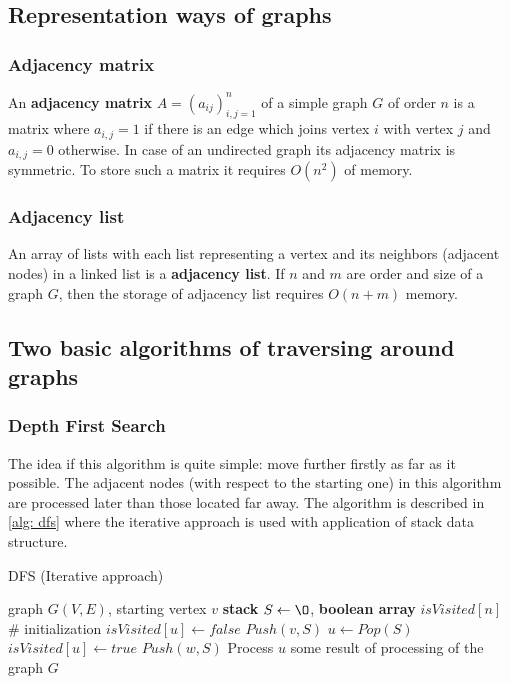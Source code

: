 \documentclass[12pt, bachelor, substylefile = algo_title.rtx]{disser}
\theoremstyle{definition}
\begin{document}
\subsection{Representation ways of graphs}
\subsubsection{Adjacency matrix}
An \textbf{adjacency matrix} $A = (a_{ij})_{i,j=1}^n$ of a simple graph $G$ of order $n$ is a matrix where $a_{i,j} = 1$ if there is an edge which joins vertex $i$ with vertex $j$ and $a_{i,j} = 0$ otherwise. In case of an undirected graph its adjacency matrix is symmetric. To store such a matrix it requires $O(n^2)$ of memory.
\subsubsection{Adjacency list}
An array of lists with each list representing a vertex and its neighbors (adjacent nodes) in a linked list is a \textbf{adjacency list}. If $n$ and $m$ are order and size of a graph $G$, then the storage of adjacency list requires $O(n+m)$ memory.

\subsection{Two basic algorithms of traversing around graphs}
\subsubsection{Depth First Search}
The idea if this algorithm is quite simple: move further firstly as far as it possible. The adjacent nodes (with respect to the starting one) in this algorithm are processed later than those located far away. The algorithm is described in \ref{alg: dfs} where the iterative approach is used with application of stack data structure.
\begin{algorithm}[!h]
\caption{DFS (Iterative approach)}
\label{alg: dfs}
\begin{algorithmic}

\Require graph $G(V, E)$, starting vertex $v$
\State \textbf{stack} $S \gets \O$, \textbf{boolean array} $isVisited[n]$\\
\# initialization
	\State $isVisited[u] \gets false$
\EndFor
\State $Push(v, S)$
	\State $u \gets Pop(S)$
		\State $isVisited[u] \gets true$
			\State $Push(w, S)$
		\EndFor
		\State Process $u$	
	\EndIf
\EndWhile
\Ensure some result of processing of the graph $G$
\end{algorithmic}
\end{algorithm}
\end{document}
